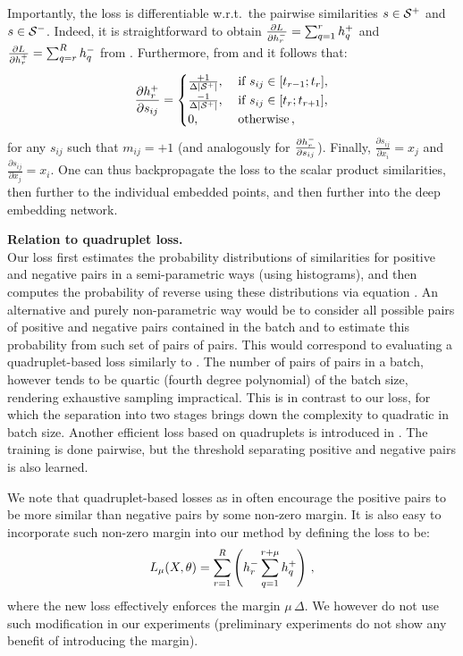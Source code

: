 Importantly, the loss  is differentiable w.r.t.\ the pairwise similarities $s\in{\mathcal S}^{+}$ and $s\in{\mathcal S}^{-}$. Indeed, it is straightforward to obtain $\frac{\partial L}{\partial h^{-}_r} = \sum_{q=1}^{r} h^{+}_q$ and $\frac{\partial L}{\partial h^{+}_r}=\sum_{q=r}^{R} h^{-}_q$ from . Furthermore, from  and  it follows that:
\begin{equation} \label{eq:histder}
\frac{\partial h^{+}_r}{\partial s_{ij}} = \begin{cases} 
     \frac{+1}{\Delta |{\mathcal S}^{+}|} ,\; &\text{if $s_{ij} \in [t_{r-1};t_r]$},\\
     \frac{-1}{\Delta |{\mathcal S}^{+}|},\; &\text{if $s_{ij} \in [t_r;t_{r+1}]$},\\
    0,\; &\text{otherwise}\,,
    \end{cases}
\end{equation}
for any $s_{ij}$ such that $m_{ij}=+1$ (and analogously for $\frac{\partial h^{-}_r}{\partial s_{ij}}$). Finally, $\frac{\partial s_{ij}}{\partial x_i}=x_j$ and $\frac{\partial s_{ij}}{\partial x_j}=x_i$. One can thus backpropagate the loss to the scalar product similarities, then further to the individual embedded points, and then further into the deep embedding network.

{\bf Relation to quadruplet loss.} \\
Our loss first estimates the probability distributions of similarities for positive and negative pairs in a semi-parametric ways (using histograms), and then computes the probability of reverse using these distributions via equation . An alternative and purely non-parametric way would be to consider all possible pairs of positive and negative pairs contained in the batch and to estimate this probability from such set of pairs of pairs. This would correspond to evaluating a quadruplet-based loss similarly to \citep{Law13,Zheng13}. The number of pairs of pairs in a batch, however tends to be quartic (fourth degree polynomial) of the batch size, rendering exhaustive sampling impractical. This is in contrast to our loss, for which the separation into two stages brings down the complexity to quadratic in batch size. Another efficient loss based on quadruplets is introduced in \citep{Tadmor2016LearningAM}. The training is done pairwise, but the threshold separating positive and negative pairs is also learned.

We note that quadruplet-based losses as in \citep{Law13,Zheng13} often encourage the positive pairs to be more similar than negative pairs by some non-zero margin. It is also easy to incorporate such non-zero margin into our method by defining the loss to be:
\begin{equation} \label{eq:margin}
L_\mu(X,\theta) = \sum_{r=1}^R \left( h^{-}_r \sum_{q=1}^{r+\mu} h^{+}_q  \right)\,,
\end{equation}
where the new loss effectively enforces the margin $\mu\,\Delta$. We however do not use such modification in our experiments (preliminary experiments do not show any benefit of introducing the margin).


